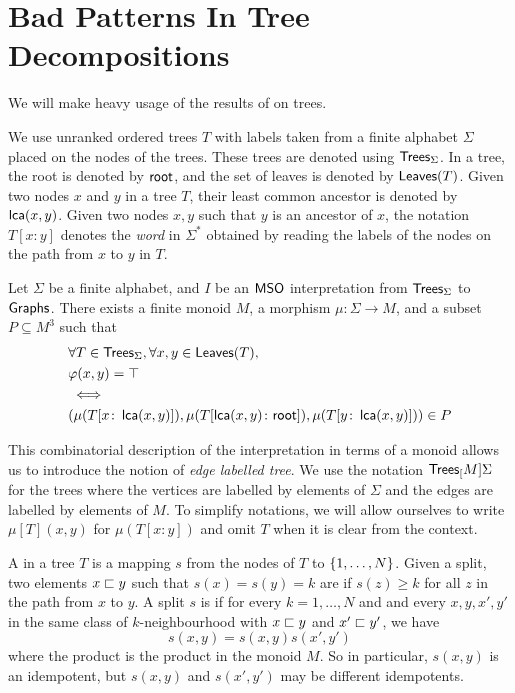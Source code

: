 \section{Bad Patterns In Tree Decompositions}
\label{sec:bad-patterns}

We will make heavy usage of the results of \cite{COLC07} on trees.

\AP We use unranked ordered trees $T$ with labels taken from a finite alphabet
$\Sigma$ placed on the nodes of the trees. These trees are denoted using
$\mathsf{Trees}_{\Sigma}$. In a tree, the root is denoted by $\mathsf{root}$, and the set of
leaves is denoted by $\mathsf{Leaves}(T)$. Given two nodes $x$ and $y$ in a tree $T$,
their least common ancestor is denoted by $\mathop{\mathsf{lca}}(x,y)$. Given two nodes $x,y$
such that $y$ is an ancestor of $x$, the notation $T[x:y]$ denotes the
\emph{word} in $\Sigma^*$ obtained by reading the labels of the nodes on the
path from $x$ to $y$ in $T$. 

\begin{lemma}
    \label{interpretation-to-monoid:lem}
    Let $\Sigma$ be a finite alphabet, and $I$ be an $\mathsf{MSO}$ interpretation
    from $\mathsf{Trees}_{\Sigma}$ to $\Graphs$.
    There exists a finite monoid $M$, a morphism
    $\mu \colon \Sigma \to M$,
    and a subset $P \subseteq M^3$ such that
    \begin{align*}
        &\forall T \in \mathsf{Trees}_{\Sigma},
        \forall x,y \in \mathsf{Leaves}(T), \\
        &\varphi(x,y) = \top \\
        &\iff \\
        &(\mu(T[x \colon \mathop{\mathsf{lca}}(x,y)]), 
          \mu(T[\mathop{\mathsf{lca}}(x,y) \colon \mathsf{root}]), 
          \mu(T[y \colon \mathop{\mathsf{lca}}(x,y)])) \in P
    \end{align*}
\end{lemma}


\AP This combinatorial description of the interpretation in terms of a monoid
allows us to introduce the notion of \emph{edge labelled tree}. We use the
notation $\mathsf{Trees}_{[}M]{\Sigma}$ for the trees where the vertices are labelled by
elements of $\Sigma$ and the edges are labelled by elements of $M$. To simplify
notations, we will allow ourselves to write $\mu[T](x,y)$ for $\mu(T[x \colon
y])$ and omit $T$ when it is clear from the context.

\AP
A  in a tree $T$ is a mapping $s$ from the nodes
of $T$ to $\{ 1, \dots, N \}$. Given a split, two elements $x \sqsubset y$ such
that $s(x) = s(y) = k$ are  if $s(z) \geq k$ for all
$z$ in the path from $x$ to $y$.
A split $s$ is  if for every $k = 1, \dots, N$ and
and every $x, y, x', y'$ in the same class of $k$-neighbourhood with $x \sqsubset
y$ and $x' \sqsubset y'$, we have
\[
    s(x,y) = s(x,y) s(x',y')
\]
where the product is the product in the monoid $M$.
So in particular, $s(x, y)$ is an idempotent, but $s(x, y)$ and $s(x', y')$ may be
different idempotents.

